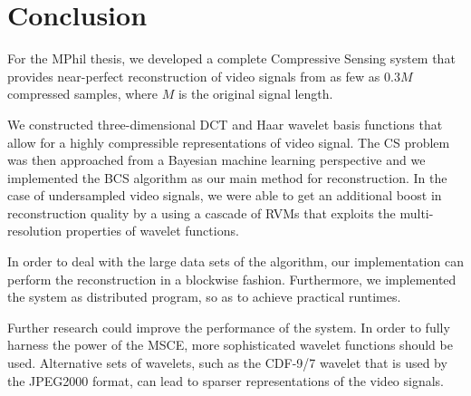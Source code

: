 \chapter{Conclusion}
\label{ch:conclusion}

For the MPhil thesis, we developed a complete Compressive Sensing system that provides near-perfect reconstruction of video signals from as few as $0.3M$ compressed samples, where $M$ is the original signal length.

We constructed three-dimensional DCT and Haar wavelet basis functions that allow for a highly compressible representations of video signal.
The CS problem was then approached from a Bayesian machine learning perspective and we implemented the BCS algorithm as our main method for reconstruction.
In the case of undersampled video signals, we were able to get an additional boost in reconstruction quality by a using a cascade of RVMs that exploits the multi-resolution properties of wavelet functions.

In order to deal with the large data sets of the algorithm, our implementation can perform the reconstruction in a blockwise fashion.
Furthermore, we implemented the system as distributed program, so as to achieve practical runtimes.

Further research could improve the performance of the system.
In order to fully harness the power of the MSCE, more sophisticated wavelet functions should be used.
Alternative sets of wavelets, such as the CDF-9/7 wavelet that is used by the JPEG2000 format, can lead to sparser representations of the video signals. 
